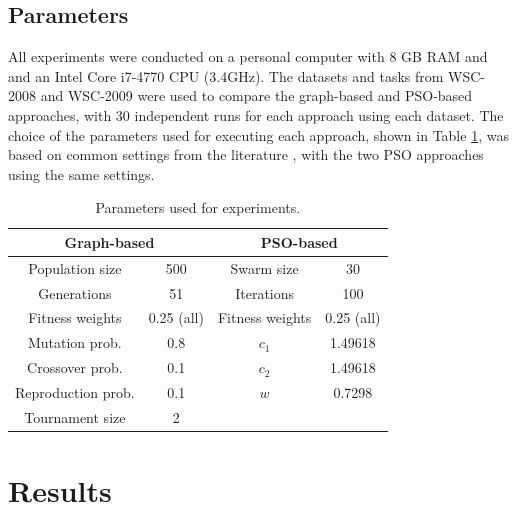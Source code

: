 \documentclass{llncs}
\begin{document}
\subsection{Parameters}

All experiments were conducted on a personal computer with 8 GB RAM and and an Intel Core i7-4770 CPU (3.4GHz). The datasets and tasks from WSC-2008 \cite{bansal2008wsc} and WSC-2009 \cite{kona2009wsc} were used to compare the graph-based and PSO-based approaches, with 30 independent runs for each approach using each dataset. The choice of the parameters used for executing each approach, shown in Table \ref{tab:parameters}, was based on common settings from the literature \cite{koza1992genetic,eberhart2001particle}, with the two PSO approaches using the same settings.

\begin{table}[h]
\centering
\caption{Parameters used for experiments.}
\label{tab:parameters}
\begin{tabular}{|c|c|c|c|}
\hline
\multicolumn{2}{|c|}{{\bf Graph-based}} & \multicolumn{2}{c|}{{\bf PSO-based}} \\ \hline
Population size        & 500            & Swarm size          & 30             \\ \hline
Generations            & 51             & Iterations          & 100            \\ \hline
Fitness weights        & 0.25 (all)     & Fitness weights     & 0.25 (all)     \\ \hline
Mutation prob.         & 0.8            & $c_1$               & 1.49618        \\ \hline
Crossover prob.        & 0.1            & $c_2$               & 1.49618        \\ \hline
Reproduction prob.     & 0.1            & $w$                 & 0.7298         \\ \hline
Tournament size        & 2              &                     &                \\ \hline
\end{tabular}
\end{table}

\section{Results}\label{results}
\end{document}
